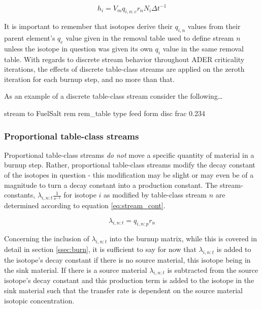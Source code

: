 \begin{equation}\label{eq:disc_iso}
h_{i} = V_{m} q_{i,n:c} r_{n} N_{i} \Delta t^{-1}
\end{equation}

It is important to remember that isotopes derive their $q_{i,n}$ values from
their parent element's $q_{e}$ value given in the removal table used
to define stream $n$ unless the isotope in question was given its own
$q_{i}$ value in the same removal table. With regards to discrete stream
behavior throughout ADER criticality iterations, the effects of discrete
table-class streams are applied on the zeroth iteration for each burnup step,
and no more than that.

As an example of a discrete table-class stream consider the following\ldots

\begin{li}
stream to FuelSalt rem rem_table type feed form disc frac 0.234
\end{li}

\subsubsection{Proportional table-class streams}\label{sssec:prem}
Proportional table-class streams \textit{do not} move a specific quantity of
material in a burnup step. Rather, proportional table-class streams modify the
decay constant of the isotopes in question - this modification may be slight
or may even be of a magnitude to turn a decay constant into a production
constant. The stream-constants, $\lambda_{i,n:t}\frac{1}{s^{-1}}$ for 
isotope $i$ as modified by table-class stream $n$ are determined according to 
equation \ref{eq:stream_cont}.

\begin{equation}\label{eq:stream_cont}
\lambda_{i,n:t} = q_{i,n:p} r_{n} 
\end{equation}

Concerning the inclusion of $\lambda_{i,n:t}$ into the burnup matrix, while this
is covered in detail in section \ref{ssec:burn}, it is sufficient to say for now
that $\lambda_{i,n:t}$ is added to the isotope's decay constant if there
is no source material, this isotope being in the sink material. If there is a
source material $\lambda_{i,n:t}$ is subtracted from the source isotope's decay
constant and this production term is added to the isotope in the sink material
such that the transfer rate is dependent on the source material
isotopic concentration.

